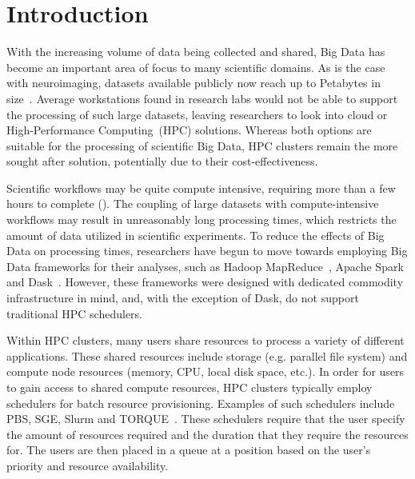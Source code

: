 \documentclass{IEEEtran}
\begin{document}
\section{Introduction}

With the increasing volume of data being collected and shared, Big Data has become
an important area of focus to many scientific domains. As is the case with neuroimaging,
datasets available publicly now reach up to Petabytes in size~\cite{UKBiobank, hcp}. Average workstations found in research labs would not be
able to support the processing of such large datasets, leaving researchers to look 
into cloud or High-Performance Computing~(HPC) solutions. Whereas both options are
suitable for the processing of scientific Big Data, HPC clusters remain the more 
sought after solution, potentially due to their cost-effectiveness.

Scientific workflows may be quite compute intensive, requiring more than a few
hours to complete (\cite{freesurfer, fmriprep, a paper which mentions duration}).
The coupling of large datasets with compute-intensive workflows may result in 
unreasonably long processing times, which restricts the amount of data 
utilized in scientific experiments. To reduce the effects of Big Data on processing
times, researchers have begun to move towards employing Big Data frameworks for their
analyses, such as Hadoop MapReduce~\cite{Hadoop},
Apache Spark~\cite{Spark} and Dask~\cite{Dask}. However, these frameworks were 
designed with dedicated commodity infrastructure in mind, and, with the exception
of Dask, do not support traditional HPC schedulers.

Within HPC clusters, many users share resources to process a variety of different
applications. These shared resources include storage (e.g. parallel file system) and 
compute node resources (memory, CPU, local disk space, etc.). In order for users to 
gain access to shared compute resources, HPC clusters typically employ schedulers for 
batch resource provisioning. Examples of such schedulers include PBS, SGE, Slurm and 
TORQUE~\cite{schedulers}. These schedulers require that the user specify the amount
of resources required and the duration that they require the resources for. The users 
are then placed in a queue at a position based on the user's priority and resource 
availability.
\end{document}
